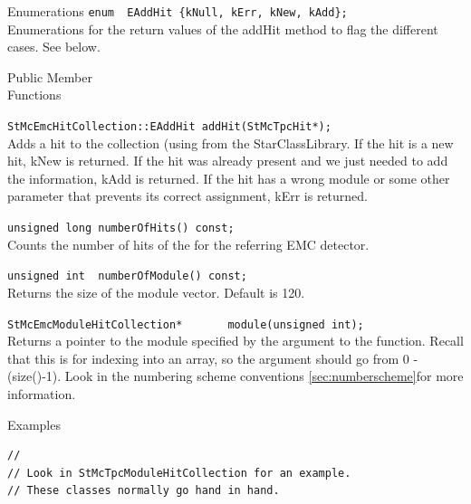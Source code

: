 \begin{Entry}
\item[Enumerations]
    \verb+enum  EAddHit {kNull, kErr, kNew, kAdd};+\\
    Enumerations for the return values of the addHit method to flag
    the different cases.  See below.
\item[Public Member\\ Functions]

    \verb+StMcEmcHitCollection::EAddHit addHit(StMcTpcHit*);+\\
    Adds a hit to the collection (using 
    from the StarClassLibrary.  If the hit is a new hit, kNew is returned.
    If the hit was already present and we just needed to add the information,
    kAdd is returned.  If the hit has a wrong module or some other parameter that
    prevents its correct assignment, kErr is returned.

    \verb+unsigned long numberOfHits() const;+\\
    Counts the number of hits of the for the referring EMC detector.

    \verb+unsigned int  numberOfModule() const;+\\
    Returns the size of the module vector.  Default is 120.

    \verb+StMcEmcModuleHitCollection*       module(unsigned int);+\\
    Returns a pointer to the module specified by the argument to the
    function.  Recall that this is for indexing into an array, so the
    argument should go from 0 - (size()-1).  Look in the
    numbering scheme conventions \ref{sec:numberscheme}for more information.

\item[Examples]
{\footnotesize
\begin{verbatim}
//
// Look in StMcTpcModuleHitCollection for an example.
// These classes normally go hand in hand.
\end{verbatim}
}%
\end{Entry}

\clearpage
%
%

